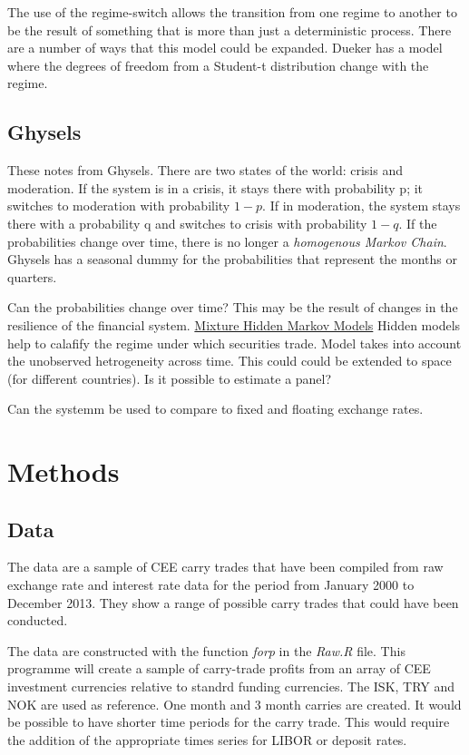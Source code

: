 \documentclass[12pt, a4paper, oneside]{article} %
\begin{document}
The use of the regime-switch allows the transition from one regime to another to be the result of something that is more than just a deterministic process. There are a number of ways that this model could be expanded.  Dueker has a model where the degrees of freedom from a Student-t distribution change with the regime.  

\subsection{Ghysels}
These notes from Ghysels.  There are two states of the world:  crisis and moderation.  If the system is in a crisis, it stays there with probability p; it switches to moderation with probability $1-p$.  If in moderation, the system stays there with a probability q and switches to crisis with probability $1-q$.  If the probabilities change over time, there is no longer a \emph{homogenous Markov Chain}. Ghysels has a seasonal dummy for the probabilities that represent the months or quarters.  

Can the probabilities change over time?  This may be the result of changes in the resilience of the financial system. 
\href{http://members.home.nl/jeroenvermunt/dias2010.pdf}{Mixture Hidden Markov Models} Hidden models help to calafify the regime under which securities trade. Model takes into account the unobserved hetrogeneity across time. This could could be extended to space (for different countries).  Is it possible to estimate a panel? 

Can the systemm be used to compare to fixed and floating exchange rates. 

\section{Methods}
\subsection{Data}
The data are a sample of CEE carry trades that have been compiled from raw exchange rate and interest rate data for the period from January 2000 to December 2013.  They show a range of possible carry trades that could have been conducted. 

The data are constructed with the function \emph{forp} in the \emph{Raw.R} file. This programme will create a sample of carry-trade profits from an array of CEE investment currencies relative to standrd funding currencies.   The ISK, TRY and NOK are used as reference.  One month and 3 month carries are created.  It would be possible to have shorter time periods for the carry trade.   This would require the addition of the appropriate times series for LIBOR or deposit rates.  
\end{document}
